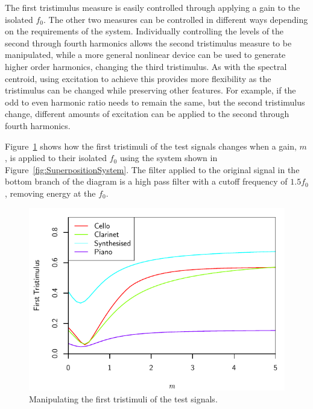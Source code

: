 		The first tristimulus measure is easily controlled through applying a gain to the isolated $f_{0}$.  The
		other two measures can be controlled in different ways depending on the requirements of the system.
		Individually controlling the levels of the second through fourth harmonics allows the second tristimulus
		measure to be manipulated, while a more general nonlinear device can be used to generate higher order
		harmonics, changing the third tristimulus. As with the spectral centroid, using excitation to achieve this
		provides more flexibility as the tristimulus can be changed while preserving other features. For example,
		if the odd to even harmonic ratio needs to remain the same, but the second tristimulus change, different
		amounts of excitation can be applied to the second through fourth harmonics.

		Figure~\ref{fig:MoveTristimulus1} shows how the first tristimuli of the test signals changes when a gain,
		$m$, is applied to their isolated $f_{0}$ using the system shown in Figure~\ref{fig:SuperpositionSystem}.
		The filter applied to the original signal in the bottom branch of the diagram is a high pass filter with a
		cutoff frequency of $1.5f_{0}$, removing energy at the $f_{0}$.

		\begin{figure}[h!]
			\centering
			\includegraphics{chapter6/Images/MoveTristimulus1.pdf}
			\caption{Manipulating the first tristimuli of the test signals.}
			\label{fig:MoveTristimulus1}
		\end{figure}

